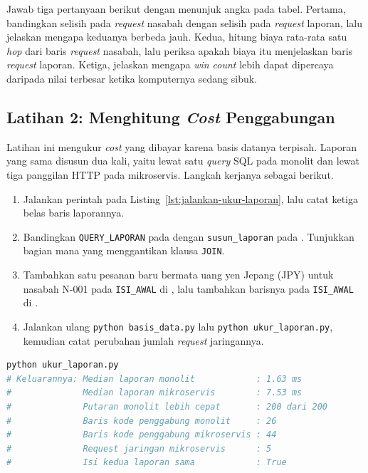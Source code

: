 Jawab tiga pertanyaan berikut dengan menunjuk angka pada tabel. Pertama,
bandingkan selisih pada \textit{request} nasabah dengan selisih pada \textit{request}
laporan, lalu jelaskan mengapa keduanya berbeda jauh. Kedua, hitung biaya
rata-rata satu \textit{hop} dari baris \textit{request} nasabah, lalu periksa apakah
biaya itu menjelaskan baris \textit{request} laporan. Ketiga, jelaskan mengapa
\textit{win count} lebih dapat dipercaya daripada nilai terbesar ketika
komputernya sedang sibuk.

\subsection*{Latihan 2: Menghitung \textit{Cost} Penggabungan}

Latihan ini mengukur \textit{cost} yang dibayar karena basis datanya terpisah. Laporan
yang sama disusun dua kali, yaitu lewat satu \textit{query} SQL pada monolit dan lewat
tiga panggilan HTTP pada mikroservis. Langkah kerjanya sebagai berikut.

\begin{enumerate}
  \item Jalankan perintah pada Listing~\ref{lst:jalankan-ukur-laporan}, lalu catat
    ketiga belas baris laporannya.
  \item Bandingkan \texttt{QUERY\_LAPORAN} pada
     dengan \texttt{susun\_laporan} pada
    . Tunjukkan bagian mana yang
    menggantikan klausa \texttt{JOIN}.
  \item Tambahkan satu pesanan baru bermata uang yen Jepang (JPY) untuk nasabah N-001 pada
    \texttt{ISI\_AWAL} di , lalu
    tambahkan barisnya pada \texttt{ISI\_AWAL} di
    .
  \item Jalankan ulang \texttt{python basis\_data.py} lalu
    \texttt{python ukur\_laporan.py}, kemudian catat perubahan jumlah \textit{request}
    jaringannya.
\end{enumerate}

\begin{lstlisting}[language=bash, caption={Mengukur \textit{cost} penggabungan, skrip
  tersedia di \berkas{sources/chapter13/ukur_laporan.py}},
  label=lst:jalankan-ukur-laporan]
python ukur_laporan.py
# Keluarannya: Median laporan monolit            : 1.63 ms
#              Median laporan mikroservis        : 7.53 ms
#              Putaran monolit lebih cepat       : 200 dari 200
#              Baris kode penggabung monolit     : 26
#              Baris kode penggabung mikroservis : 44
#              Request jaringan mikroservis      : 5
#              Isi kedua laporan sama            : True
\end{lstlisting}

